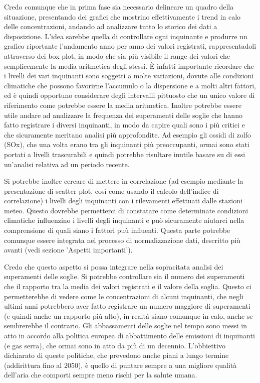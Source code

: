 \documentclass{article}
\begin{document}
Credo comunque che in prima fase sia necessario delineare un quadro della situazione, presentando dei grafici che mostrino effettivamente i trend in calo delle concentrazioni, andando ad analizzare tutto lo storico dei dati a disposizione. L'idea sarebbe quella di controllare ogni inquinante e produrre un grafico riportante l'andamento anno per anno dei valori registrati, rappresentadoli attraverso dei box plot, in modo che sia più visibile il range dei valori che semplicemente la media aritmetica degli stessi. È infatti importante ricordare che i livelli dei vari inquinanti sono soggetti a molte variazioni, dovute alle condizioni climatiche che possono favorirne l'accumulo o la dispersione e a molti altri fattori, ed è quindi opportuno considerare degli intervalli pittuosto che un unico valore di riferimento come potrebbe essere la media aritmetica.
Inoltre potrebbe essere utile andare ad analizzare la frequenza dei superamenti delle soglie che hanno fatto registrare i diversi inquinanti, in modo da capire quali sono i più critici e che sicuramente meritano analisi più approfondite. Ad esempio gli ossidi di zolfo (SOx), che una volta erano tra gli inquinanti più preoccupanti, ormai sono stati portati a livelli trascurabili e quindi potrebbe risultare inutile basare su di essi un'analisi relativa ad un periodo recente.

Si potrebbe inoltre cercare di mettere in correlazione (ad esempio mediante la presentazione di scatter plot, così come usando il calcolo dell'indice di correlazione) i livelli degli inquinanti con i rilevamenti effettuati dalle stazioni meteo. Questo dovrebbe permetterci di constatare come determinate condizioni climatiche influenzino i livelli degli inquinanti e può sicuramente aiutarci nella comprensione di quali siano i fattori puù influenti. Questa parte potrebbe comunque essere integrata nel processo di normalizzazione dati, descritto più avanti (vedi sezione 'Aspetti importanti').

Credo che questo aspetto si possa integrare nella sopracitata analisi dei superamenti delle soglie. Si potrebbe controllare sia il numero dei superamenti che il rapporto tra la media dei valori registrati e il valore della soglia. Questo ci permetterebbe di vedere come le concentrazioni di alcuni inquinanti, che negli ultimi anni potrebbero aver fatto registrare un numero maggiore di superamenti (e quindi anche un rapporto più alto), in realtà siano comunque in calo, anche se sembrerebbe il contrario. Gli abbassamenti delle soglie nel tempo sono messi in atto in accordo alla politica europea di abbattimento delle emissioni di inquinanti (e gas serra), che ormai sono in atto da più di un decennio. L'obbiettivo dichiarato di queste politiche, che prevedono anche piani a lungo termine (addirittura fino al 2050), è quello di puntare sempre a una migliore qualità dell'aria che comporti sempre meno rischi per la salute umana.
\end{document}
